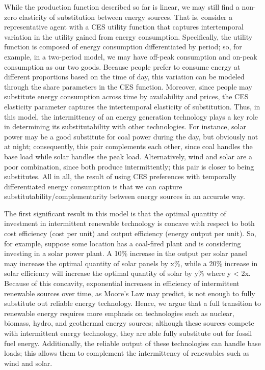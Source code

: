 \documentclass[11pt,a4paper]{extarticle}
\begin{document}
While the production function described so far is linear, we may still find a non-zero elasticity of substitution between energy sources. That is, consider a representative agent with a CES utility function that captures intertemporal variation in the utility gained from energy consumption. Specifically, the utility function is composed of energy consumption differentiated by period; so, for example, in a two-period model, we may have off-peak consumption and on-peak consumption as our two goods. Because people prefer to consume energy at different proportions based on the time of day, this variation can be modeled through the share parameters in the CES function. Moreover, since people may substitute energy consumption across time by availability and prices, the CES elasticity parameter captures the intertemporal elasticity of substitution. Thus, in this model, the intermittency of an energy generation technology plays a key role in determining its substitutability with other technologies. For instance, solar power may be a good substitute for coal power during the day, but obviously not at night; consequently, this pair complements each other, since coal handles the base load while solar handles the peak load. Alternatively, wind and solar are a poor combination, since both produce intermittently; this pair is closer to being substitutes. All in all, the result of using CES preferences with temporally differentiated energy consumption is that we can capture substitutability/complementarity between energy sources in an accurate way. 

The first significant result in this model is that the optimal quantity of investment in intermittent renewable technology is concave with respect to both cost efficiency (cost per unit) and output efficiency (energy output per unit). So, for example, suppose some location has a coal-fired plant and is considering investing in a solar power plant. A 10\% increase in the output per solar panel may increase the optimal quantity of solar panels by x\%, while a 20\% increase in solar efficiency will increase the optimal quantity of solar by y\% where y < 2x. Because of this concavity, exponential increases in efficiency of intermittent renewable sources over time, as Moore’s Law may predict, is not enough to fully substitute out reliable energy technology. Hence, we argue that a full transition to renewable energy requires more emphasis on technologies such as nuclear, biomass, hydro, and geothermal energy sources; although these sources compete with intermittent energy technology, they are able fully substitute out for fossil fuel energy. Additionally, the reliable output of these technologies can handle base loads; this allows them to complement the intermittency of renewables such as wind and solar. 
\end{document}
